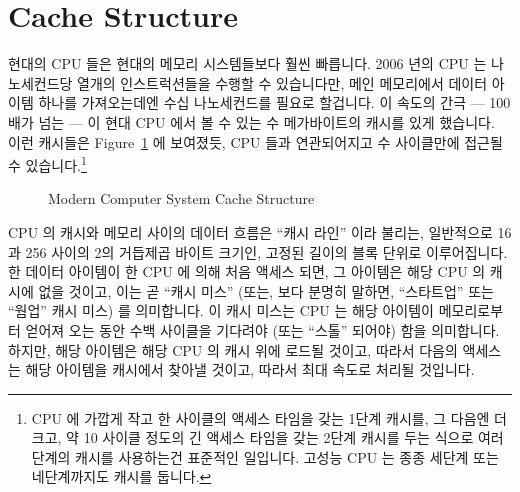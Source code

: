 \section{Cache Structure}
\label{sec:app:whymb:Cache Structure}

현대의 CPU 들은 현대의 메모리 시스템들보다 훨씬 빠릅니다.
2006 년의 CPU 는 나노세컨드당 열개의 인스트럭션들을 수행할 수 있습니다만, 메인
메모리에서 데이터 아이템 하나를 가져오는데엔 수십 나노세컨드를 필요로 할겁니다.
이 속도의 간극 --- 100 배가 넘는 --- 이 현대 CPU 에서 볼 수 있는 수
메가바이트의 캐시를 있게 했습니다.
이런 캐시들은 Figure~\ref{fig:app:whymb:Modern Computer System Cache Structure}
에 보여졌듯, CPU 들과 연관되어지고 수 사이클만에 접근될 수 있습니다.\footnote{
	CPU 에 가깝게 작고 한 사이클의 액세스 타임을 갖는 1단계 캐시를, 그
	다음엔 더 크고, 약 10 사이클 정도의 긴 액세스 타임을 갖는 2단계 캐시를
	두는 식으로 여러 단계의 캐시를 사용하는건 표준적인 일입니다.
	고성능 CPU 는 종종 세단계 또는 네단계까지도 캐시를 둡니다.}

\begin{figure}[htb]
\centering
{}
\caption{Modern Computer System Cache Structure}
\label{fig:app:whymb:Modern Computer System Cache Structure}
\end{figure}

CPU 의 캐시와 메모리 사이의 데이터 흐름은 ``캐시 라인'' 이라 불리는, 일반적으로
16 과 256 사이의 2의 거듭제곱 바이트 크기인, 고정된 길이의 블록 단위로
이루어집니다.
한 데이터 아이템이 한 CPU 에 의해 처음 액세스 되면, 그 아이템은 해당 CPU 의
캐시에 없을 것이고, 이는 곧 ``캐시 미스'' (또는, 보다 분명히 말하면,
``스타트업'' 또는 ``웜업'' 캐시 미스) 를 의미합니다.
이 캐시 미스는 CPU 는 해당 아이템이 메모리로부터 얻어져 오는 동안 수백 사이클을
기다려야 (또는 ``스톨'' 되어야) 함을 의미합니다.
하지만, 해당 아이템은 해당 CPU 의 캐시 위에 로드될 것이고, 따라서 다음의 액세스는
해당 아이템을 캐시에서 찾아낼 것이고, 따라서 최대 속도로 처리될 것입니다.
\iffalse

